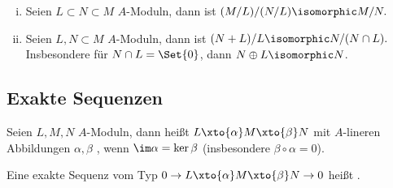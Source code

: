 \begin{st}[Isomorphiesätze]
    \begin{enumerate}[(i)]
        \item
            Seien $L \subset N \subset M$ $A$-Moduln, dann ist
            \begin{math}
                (M / L) / (N / L) \isomorphic M / N.
            \end{math}
        \item
            Seien $L,N \subset M$ $A$-Moduln, dann ist
            \begin{math}
                (N + L) / L  \isomorphic N / (N \cap L).
            \end{math}
            Insbesondere für $N \cap L = \Set{0}$, dann $N \oplus L \isomorphic N$.
    \end{enumerate}
\end{st}

\subsection{Exakte Sequenzen}

\begin{df}
    Seien $L, M, N$ $A$-Moduln, dann heißt $L \xto{\alpha} M \xto{\beta} N$ mit $A$-lineren Abbildungen $\alpha, \beta$ , wenn $\im \alpha = \ker \beta$ (insbesondere $\beta \circ \alpha = 0$).

    Eine exakte Sequenz vom Typ $0 \to L \xto{\alpha} M \xto{\beta} N \to 0$ heißt .
\end{df}

